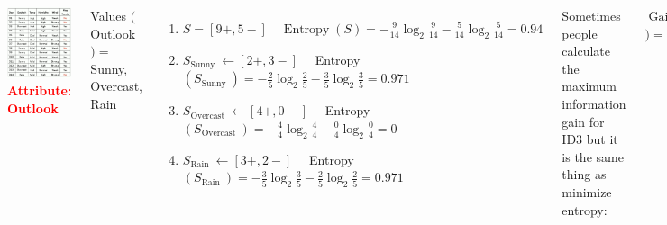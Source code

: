 \documentclass[9pt,dvipsnames]{beamer}
\begin{document}
	\begin{frame}
		
		\begin{columns}[T]
			\includegraphics[width=\textwidth]{imgs/algorithm_9.png}
			\textcolor{red}{\textbf{Attribute: Outlook}}
			 
			Values \((\) Outlook \()=\) Sunny, Overcast, Rain
			\begin{enumerate}
				\item 	\(S=[9+, 5-] \quad \operatorname{Entropy}(S)=-\frac{9}{14} \log _{2} \frac{9}{14}-\frac{5}{14} \log _{2} \frac{5}{14}=0.94\)
				\item 	\(S_{\text {Sunny }} \leftarrow[2+, 3-] \quad\) Entropy \(\left(S_{\text {Sunny }}\right)=-\frac{2}{5} \log _{2} \frac{2}{5}-\frac{3}{5} \log _{2} \frac{3}{5}=0.971\)
				\item \(S_{\text {Overcast }} \leftarrow[4+, 0-] \quad\) Entropy \(\left(S_{\text {Overcast }}\right)=-\frac{4}{4} \log _{2} \frac{4}{4}-\frac{0}{4} \log _{2} \frac{0}{4}=0\)
				\item \(S_{\text {Rain }} \leftarrow[3+, 2-] \quad\) Entropy \(\left(S_{\text {Rain }}\right)=-\frac{3}{5} \log _{2} \frac{3}{5}-\frac{2}{5} \log _{2} \frac{2}{5}=0.971\)
			\end{enumerate}
			Sometimes people calculate the maximum information gain for ID3 but it is the same thing as minimize entropy: 
			
			\(\operatorname{Gain}(S\), Outlook \()=\operatorname{Entropy}(S)-\sum_{v \in\{\text { Sunny,Overcast,Rain }\}} \frac{\left|S_{v}\right|}{|S|} \operatorname{Entropy}\left(S_{v}\right)\)
		\end{columns}
	\end{frame}
	
\end{document}
